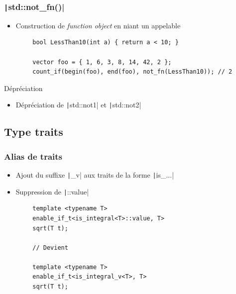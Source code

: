 \documentclass[C++.tex]{subfiles}
\begin{document}
\begin{frame}[fragile]
	\frametitle{\texttt|std::not_fn()|}
	\begin{itemize}
		\item Construction de \textit{function object} en niant un appelable
	\end{itemize}

	\begin{verbatim}
		bool LessThan10(int a) { return a < 10; }

		vector foo = { 1, 6, 3, 8, 14, 42, 2 };
		count_if(begin(foo), end(foo), not_fn(LessThan10)); // 2
	\end{verbatim}

	\begin{block}{Dépréciation}
		\begin{itemize}
			\item Dépréciation de \texttt|std::not1| et \texttt|std::not2|
		\end{itemize}
	\end{block}
\end{frame}

\subsection*{Type traits}
\begin{frame}[fragile]
	\frametitle{Alias de traits}
	\begin{itemize}
		\item Ajout du suffixe \texttt|_v| aux traits de la forme \texttt|is_...|
		\item Suppression de \texttt|::value|
	\end{itemize}

	\begin{verbatim}
		template <typename T>
		enable_if_t<is_integral<T>::value, T>
		sqrt(T t);

		// Devient 

		template <typename T>
		enable_if_t<is_integral_v<T>, T>
		sqrt(T t);
	\end{verbatim}
\end{frame}
\end{document}

